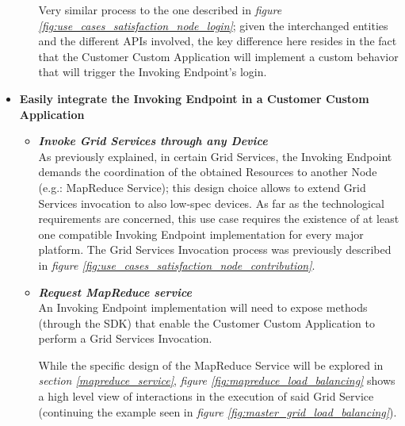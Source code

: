 \begin{itemize}
\begin{itemize}
        Very similar process to the one described in \textit{figure \ref{fig:use_cases_satisfaction_node_login}}; given the interchanged entities and the different APIs involved, the key difference here resides in the fact that the Customer Custom Application will implement a custom behavior that will trigger the Invoking Endpoint's login. 
    \end{itemize}
    \item \textbf{Easily integrate the Invoking Endpoint in a Customer Custom Application}\\
    \begin{itemize}
        \item \textbf{\textit{Invoke Grid Services through any Device}}\\
        As previously explained, in certain Grid Services, the Invoking Endpoint demands the coordination of the obtained Resources to another Node (e.g.: MapReduce Service); this design choice allows to extend Grid Services invocation to also low-spec devices. As far as the technological requirements are concerned, this use case requires the existence of at least one compatible Invoking Endpoint implementation for every major platform.
        The Grid Services Invocation process was previously described in \textit{figure \ref{fig:use_cases_satisfaction_node_contribution}}.

        \item \textbf{\textit{Request MapReduce service}}\\
        An Invoking Endpoint implementation will need to expose methods (through the SDK) that enable the Customer Custom Application to perform a Grid Services Invocation.

        While the specific design of the MapReduce Service will be explored in \textit{section \ref{mapreduce_service}}, \textit{figure \ref{fig:mapreduce_load_balancing}} shows a high level view of interactions in the execution of said Grid Service (continuing the example seen in \textit{figure \ref{fig:master_grid_load_balancing}}).


\end{itemize}
\end{itemize}
